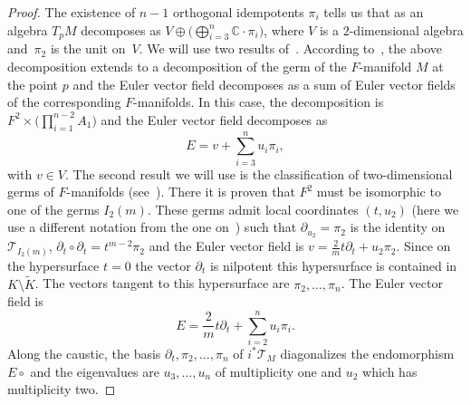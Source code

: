 \documentclass[10pt,a4paper]{amsart}
\numberwithin{equation}{section}
\begin{document}
\begin{proof}
 The existence of $n-1$ orthogonal idempotents $\pi_{i}$ tells us that as an algebra $T_{p}M$ decomposes as $V\oplus\bigl(\bigoplus_{i=3}^{n}\mathbb{C}\cdot\pi_{i}\bigr)$, where $V$ is a $2$-dimensional algebra and~$\pi_{2}$ is the unit on~$V$. We will use two results of~\cite{HertlingFrobenius}. According to~\cite[Theorem~2.11]{HertlingFrobenius}, the above decomposition extends to a decomposition of the germ of the $F$-manifold $M$ at the point $p$ and the Euler vector field decomposes as a sum of Euler vector fields of the corresponding $F$-manifolds. In this case, the decomposition is $F^{2}\times\bigl(\prod_{i=1}^{n-2}A_{1}\bigr) $ and the Euler vector field decomposes as
 \begin{equation*}
 E= v+\sum_{i=3}^{n}u_{i}\pi_{i},
 \end{equation*}
 with $v\in V$. The second result we will use is the classification of two-dimensional germs of $F$-manifolds (see~\cite[Example~2.12\,(iv) and Theorem~4.7\,(a)]{HertlingFrobenius}).
 There it is proven that $F^{2}$ must be isomorphic to one of the germs $I_{2}(m)$. These germs admit local coordinates $(t,u_{2})$ (here we use a different notation from the one on~\cite{HertlingFrobenius}) such that $\partial_{u_{2}}=\pi_{2}$ is the identity on $\mathcal{T}_{I_{2}(m)}$, $\partial_{t}\circ\partial_{t}=t^{m-2}\pi_{2}$ and the Euler vector field is $v=\tfrac{2}{m}t\partial_{t}+u_{2}\pi_{2}$. Since on the hypersurface $t=0$ the vector $\partial_{t}$ is nilpotent this hypersurface is contained in $K\setminus\tilde{K}$. The vectors tangent to this hypersurface are $\pi_{2},\dots,\pi_{n}$. The Euler vector field is
 \begin{equation*}
 E=\frac{2}{m}t\partial_{t}+\sum_{i=2}^{n}u_{i}\pi_{i}.
 \end{equation*}
 Along the caustic, the basis $\partial_{t},\pi_{2},\dots,\pi_{n}$ of $i^{*}\mathcal{T}_{M}$ diagonalizes the endomorphism $E\circ$ and the eigenvalues are $u_{3},\dots,u_{n}$ of multiplicity one and $u_{2}$ which has multiplicity two.
\end{proof}
\end{document}
